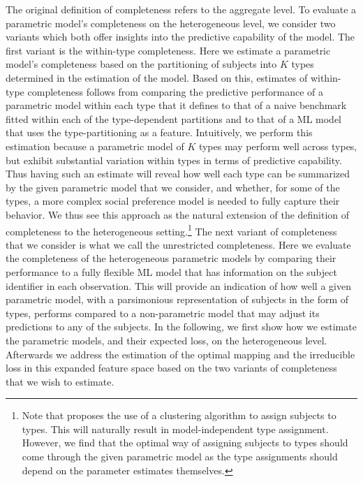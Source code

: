 \documentclass[11pt,a4paper]{article}
\theoremstyle{definition}
\begin{document}
The original definition of completeness refers to the aggregate level. To evaluate a parametric model's completeness on the heterogeneous level, we consider two variants which both offer insights into the predictive capability of the model. The first variant is the within-type completeness.  Here we estimate a parametric model's completeness based on the partitioning of subjects into \(K\) types determined in the estimation of the model.  Based on this, estimates of within-type completeness follows from comparing the predictive performance of a parametric model within each type that it defines to that of a naive benchmark fitted within each of the type-dependent partitions and to that of a ML model that uses the type-partitioning as a feature.  Intuitively, we perform this estimation because a parametric model of \(K\) types may perform well across types, but exhibit substantial variation within types in terms of predictive capability. Thus having such an estimate will reveal how well each type can be summarized by the given parametric model that we consider, and whether, for some of the types, a more complex social preference model is needed to fully capture their behavior. We thus see this approach as the natural extension of the definition of completeness to the heterogeneous setting.\footnote{Note that \cite{Fudenberg2021b} proposes the use of a clustering algorithm to assign subjects to types. This will naturally result in model-independent type assignment. However, we find that the optimal way of assigning subjects to types should come through the given parametric model as the type assignments should depend on the parameter estimates themselves.} The next variant of completeness that we consider is what we call the unrestricted completeness. Here we evaluate the completeness of the heterogeneous parametric models by comparing their performance to a fully flexible ML model that has information on the subject identifier in each observation. This will provide an indication of how well a given parametric model, with a parsimonious representation of subjects in the form of types, performs compared to a non-parametric model that may adjust its predictions to any of the subjects. In the following, we first show how we estimate the parametric models, and their expected loss, on the heterogeneous level. Afterwards we address the estimation of the optimal mapping and the irreducible loss in this expanded feature space based on the two variants of completeness that we wish to estimate.
\end{document}

